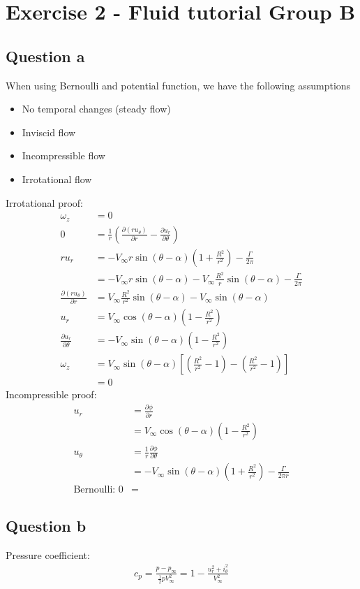 \documentclass[class=report, crop=false, 12pt,a4paper]{standalone}
\begin{document}
\section{Exercise 2 - Fluid tutorial Group B}
\subsection*{Question a}
When using Bernoulli and potential function, we have the following assumptions
\begin{itemize}
  \item No temporal changes (steady flow)
  \item Inviscid flow
  \item Incompressible flow
  \item Irrotational flow
\end{itemize}
Irrotational proof:
\begin{align}
  \omega_z &= 0\\
  0 &= \frac{1}{r}\left(\frac{\partial (ru_\theta)}{\partial r} - \frac{\partial u_r}{\partial \theta}\right)\\
  ru_r &= - V_\infty r\sin{(\theta - \alpha)} \left(1 + \frac{R^2}{r^2}\right) - \frac{\Gamma}{2\pi}\\
  &= - V_\infty r\sin{(\theta - \alpha)} - V_\infty \frac{R^2}{r}\sin{(\theta - \alpha)} - \frac{\Gamma}{2\pi}\\
  \frac{\partial (ru_\theta)}{\partial r} &= V_\infty \frac{R^2}{r^2}\sin{(\theta - \alpha)} - V_\infty \sin{(\theta - \alpha)}\\
  u_r &= V_\infty \cos{(\theta - \alpha)}\left(1 - \frac{R^2}{r^2}\right)\\
  \frac{\partial u_r}{\partial \theta} &= - V_\infty \sin{(\theta - \alpha)}\left(1 - \frac{R^2}{r^2}\right)\\
  \omega_z &= V_\infty \sin{(\theta - \alpha)} \left[ \left(\frac{R^2}{r^2}-1\right) - \left(\frac{R^2}{r^2}-1\right) \right]\\
  &= 0
\end{align}
Incompressible proof:
\begin{align}
  u_r &= \frac{\partial \phi}{\partial r}\\
  &= V_\infty \cos{(\theta - \alpha)}\left(1 - \frac{R^2}{r^2}\right)\\
  u_\theta &= \frac{1}{r}\frac{\partial \phi}{\partial \theta}\\
  &= - V_\infty \sin{(\theta - \alpha)} \left(1 + \frac{R^2}{r^2}\right) - \frac{\Gamma}{2\pi r}\\
  \textrm{Bernoulli: } 0 &= 
\end{align}
\subsection{Question b}
Pressure coefficient:
\begin{align}
  c_p = \frac{p - p_\infty}{\frac{1}{2}pV_\infty^2} = 1 - \frac{u_r^2 + i_\theta^2}{V_\infty^2}
\end{align}
\end{document}
